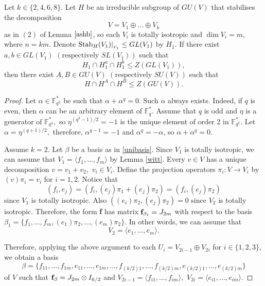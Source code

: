 \begin{Lem} \label{m2isotr}
Let $k \in \{2,4,6,8\}$. Let $H$ be an irreducible subgroup of $GU(V)$  that stabilises the decomposition 
$$V=V_1 \oplus \ldots \oplus V_k$$
as in $(2)$ of Lemma $\ref{ashb}$, so each $V_i$ is totally isotropic  and $\dim V_i=m,$ where $n=km.$ Denote $ \mathrm{Stab}_H(V_1)|_{_{V_1}} \le GL(V_1)$ by $H_1.$ 
If there exist $a,b \in GL(V_1)$ $(\text{respectively } SL(V_1))$ such that 
$$H_1 \cap H_1^a \cap H_1^b \le Z(GL(V_1)),$$
then there exist $A, B \in GU(V)$ $(\text{respectively } SU(V))$ such that
$$H \cap H^A \cap H^B \le Z(GU(V)).$$ 
\end{Lem}
\begin{proof}
Let $\alpha \in \mathbb{F}_{q^2}^*$ be such that $\alpha + \alpha^q=0.$ Such $\alpha$ always exists. Indeed,
if $q$ is even, then $\alpha$ can be an arbitrary element of $\mathbb{F}_q^*.$ Assume that $q$ is odd and $\eta$ is a generator of $\mathbb{F}_{q^2}^*,$ so  $\eta^{(q^2-1)/2}=-1$ is the unique element of order 2 in $\mathbb{F}_{q^2}^*.$ Let $\alpha =\eta^{(q+1)/2},$ therefore, $\alpha^{q-1}=-1$ and $\alpha^q=-\alpha$, so $\alpha+\alpha^q=0.$

Assume $k=2.$ Let $\beta$ be a basis as in \eqref{unibasis}. Since $V_1$ is totally isotropic, we can assume that $V_1=\langle f_1, \ldots, f_m \rangle$ by Lemma \ref{witt}. Every $v \in V$ has a unique decomposition $v=v_1+v_2,$ $v_i \in V_i.$ Define the projection operators $\pi_i: V \to V_i$ by $(v)\pi_i=v_i$ for $i=1,2$. Notice that $$(f_i,e_j)=(f_i, (e_j)\pi_1+(e_j)\pi_2)=(f_i,(e_j)\pi_2)$$
since $V_1$ is totally isotropic. Also 
$((e_i)\pi_2, (e_j)\pi_2)=0$
since $V_2$ is totally isotropic. Therefore, the form {\bf f} has matrix ${\bf f}_{\beta_1}= J_{2m}$ with respect to the basis $ \beta_1=\{f_1, \ldots, f_m, (e_1)\pi_2, \ldots, (e_m)\pi_2\}.$ In other words, we can assume  that $$V_2= \langle e_1, \ldots, e_m \rangle.$$  

Therefore, applying the  above argument to each $U_i=V_{2i-1} \oplus V_{2i}$ for $i \in \{1,2,3\}$, we obtain  a basis $$\beta= \{ f_{11}, \ldots, f_{1m}, e_{11}, \ldots, e_{1m}, \ldots, f_{(k/2)1}, \ldots, f_{(k/2)m}, e_{(k/2)1}, \ldots, e_{(k/2)m} \}$$ of $V$ such that ${\bf f}_{\beta}=J_{2m} \otimes I_{k/2}$ and $V_{2i-1}=\langle f_{i1}, \ldots, f_{im} \rangle,$ $V_{2i}=\langle e_{i1}, \ldots, e_{im} \rangle.$ 


\end{proof}
